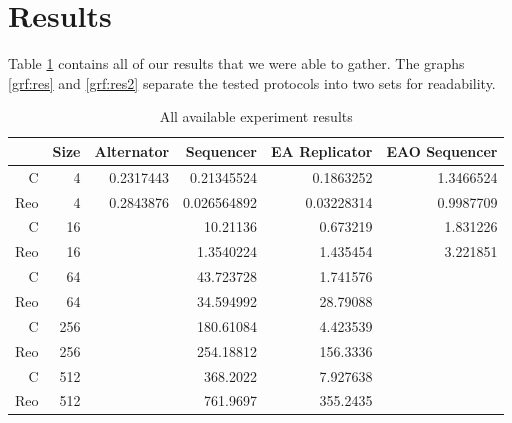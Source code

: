 \section{Results}
Table \ref{tab:res} contains all of our results that we were able to gather. The graphs \ref{grf:res} and \ref{grf:res2} separate the tested protocols into two sets for readability.
\begin{table}[h]
\begin{center}
    \begin{tabular}{rr|rrrr}
     & \textbf{Size} & \textbf{Alternator} & \textbf{Sequencer} & \textbf{EA Replicator} & \textbf{EAO Sequencer} \\ \hline
    C & 4       & 0.2317443     & 0.21345524    & 0.1863252     & 1.3466524     \\
    Reo & 4     & 0.2843876     & 0.026564892   & 0.03228314    & 0.9987709     \\ \hline
    C & 16      &               & 10.21136      & 0.673219      & 1.831226      \\
    Reo & 16    &               & 1.3540224     & 1.435454      & 3.221851      \\ \hline
    C & 64      &               & 43.723728     & 1.741576      &               \\
    Reo & 64    &               & 34.594992     & 28.79088      &               \\ \hline
    C & 256     &               & 180.61084     & 4.423539      &               \\
    Reo & 256   &               & 254.18812     & 156.3336      &               \\ \hline
    C & 512     &               & 368.2022      & 7.927638      &               \\
    Reo & 512   &               & 761.9697      & 355.2435      &
    \end{tabular}\\
    \caption{All available experiment results}
    \label{tab:res}
\end{center}
\end{table}

